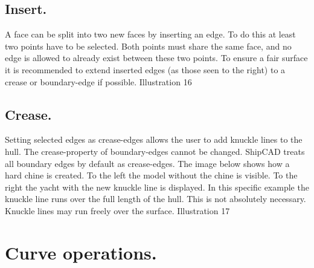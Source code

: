\documentclass[12pt]{article}
\begin{document}
\subsection{Insert.}
A face can be split into two new faces by
inserting an edge. To do this at least two points
have to be selected. Both points must share the
same face, and no edge is allowed to already
exist between these two points. To ensure a fair
surface it is recommended to extend inserted
edges (as those seen to the right) to a crease or
boundary-edge if possible.
Illustration 16

\subsection{Crease.}
Setting selected edges as crease-edges allows the user to add knuckle lines to the hull. The
crease-property of boundary-edges cannot be changed. ShipCAD treats all boundary edges by
default as crease-edges. The image below shows how a hard chine is created. To the left the model
without the chine is visible. To the right the yacht with the new knuckle line is displayed. In this
specific example the knuckle line runs over the full length of the hull. This is not absolutely
necessary. Knuckle lines may run freely over the surface.
Illustration 17

\section{Curve operations.}
\end{document}
